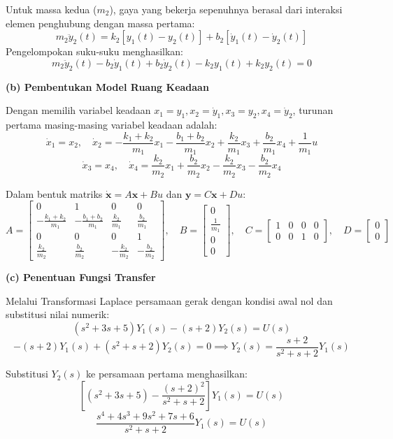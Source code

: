 \documentclass[11pt,a4paper]{article}
\begin{document}
Untuk massa kedua ($m_2$), gaya yang bekerja sepenuhnya berasal dari interaksi elemen penghubung dengan massa pertama:
$$m_2 \ddot{y}_2(t) = k_2 [y_1(t) - y_2(t)] + b_2 [\dot{y}_1(t) - \dot{y}_2(t)]$$
Pengelompokan suku-suku menghasilkan:
$$m_2 \ddot{y}_2(t) - b_2 \dot{y}_1(t) + b_2 \dot{y}_2(t) - k_2 y_1(t) + k_2 y_2(t) = 0$$

\textbf{(b) Pembentukan Model Ruang Keadaan}

Dengan memilih variabel keadaan $x_1 = y_1, x_2 = \dot{y}_1, x_3 = y_2, x_4 = \dot{y}_2$, turunan pertama masing-masing variabel keadaan adalah:
$$\dot{x}_1 = x_2, \quad \dot{x}_2 = -\frac{k_1 + k_2}{m_1} x_1 - \frac{b_1 + b_2}{m_1} x_2 + \frac{k_2}{m_1} x_3 + \frac{b_2}{m_1} x_4 + \frac{1}{m_1} u$$
$$\dot{x}_3 = x_4, \quad \dot{x}_4 = \frac{k_2}{m_2} x_1 + \frac{b_2}{m_2} x_2 - \frac{k_2}{m_2} x_3 - \frac{b_2}{m_2} x_4$$

Dalam bentuk matriks $\dot{\mathbf{x}} = A\mathbf{x} + B u$ dan $\mathbf{y} = C\mathbf{x} + D u$:
$$A = \begin{bmatrix} 0 & 1 & 0 & 0 \\ -\frac{k_1 + k_2}{m_1} & -\frac{b_1 + b_2}{m_1} & \frac{k_2}{m_1} & \frac{b_2}{m_1} \\ 0 & 0 & 0 & 1 \\ \frac{k_2}{m_2} & \frac{b_2}{m_2} & -\frac{k_2}{m_2} & -\frac{b_2}{m_2} \end{bmatrix}, \quad B = \begin{bmatrix} 0 \\ \frac{1}{m_1} \\ 0 \\ 0 \end{bmatrix}, \quad C = \begin{bmatrix} 1 & 0 & 0 & 0 \\ 0 & 0 & 1 & 0 \end{bmatrix}, \quad D = \begin{bmatrix} 0 \\ 0 \end{bmatrix}$$

\textbf{(c) Penentuan Fungsi Transfer}

Melalui Transformasi Laplace persamaan gerak dengan kondisi awal nol dan substitusi nilai numerik:
$$(s^2 + 3s + 5) Y_1(s) - (s + 2) Y_2(s) = U(s)$$
$$-(s + 2) Y_1(s) + (s^2 + s + 2) Y_2(s) = 0 \implies Y_2(s) = \frac{s + 2}{s^2 + s + 2} Y_1(s)$$

Substitusi $Y_2(s)$ ke persamaan pertama menghasilkan:
$$\left[ (s^2 + 3s + 5) - \frac{(s+2)^2}{s^2 + s + 2} \right] Y_1(s) = U(s)$$
$$\frac{s^4 + 4s^3 + 9s^2 + 7s + 6}{s^2 + s + 2} Y_1(s) = U(s)$$
\end{document}
